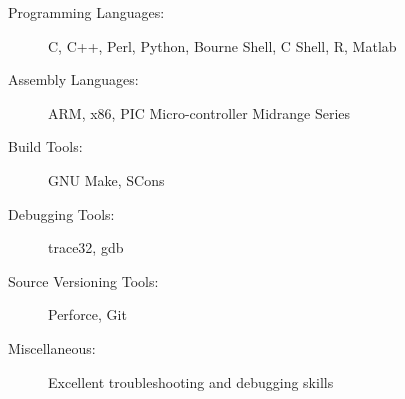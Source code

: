 \begin{description}
\item[Programming Languages:]
C, C++, Perl, Python, Bourne Shell, C Shell, R, Matlab
\item[Assembly Languages:]
ARM, x86, PIC Micro-controller Midrange Series
\item[Build Tools:]
GNU Make, SCons
\item[Debugging Tools:]
trace32, gdb
\item[Source Versioning Tools:]
Perforce, Git
\item[Miscellaneous:]
Excellent troubleshooting and debugging skills
\end{description}
